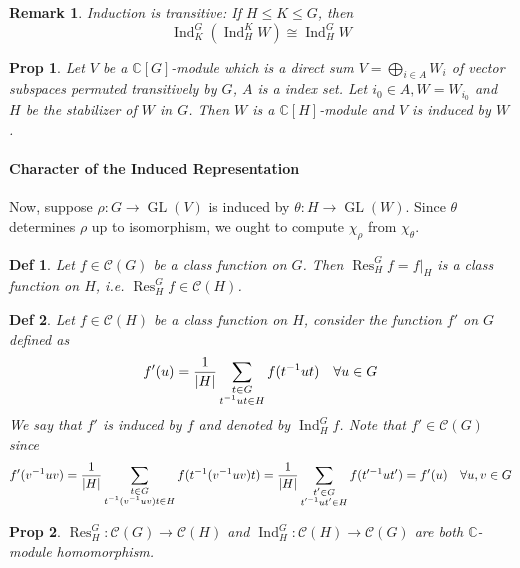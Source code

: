 \documentclass[a4paper]{article}
\DeclarePairedDelimiter{\abs}{\lvert}{\rvert}
\newcommand*{\Cb}{\mathbb{C}}
\newcommand*{\Cc}{\mathcal{C}}
\DeclareMathOperator{\Res}{Res}
\DeclareMathOperator{\Ind}{Ind}
\newcommand*\GL[1]{\operatorname{GL}\mathopen{}\left({#1}\right)\mathclose{}}
\theoremstyle{mystyle}
\newtheorem{remark}{Remark}
\newtheorem{definition}{Def}
\newtheorem{prop}{Prop}
\begin{document}
\begin{remark}
  Induction is transitive: If $H \le K \le G$, then
  \[
    \Ind^G_K (\Ind^K_H W) \cong \Ind^G_H W
  \]
\end{remark}

\begin{prop}
  Let $V$ be a $\Cb[G]$-module which is a direct sum
  $V = \bigoplus_{i \in A} W_i$ of vector subspaces {\it permuted transitively}
  by $G$, $A$ is a index set. Let $i_0 \in A, W = W_{i_0}$ and
  $H$ be the stabilizer of $W$ in $G$.
  Then $W$ is a $\Cb[H]$-module and $V$ is induced by $W$.
\end{prop}


\paragraph{Character of the Induced Representation}
Now, suppose $\rho: G\to \GL{V}$ is induced by $\theta: H\to \GL{W}$.
Since $\theta$ determines $\rho$ up to isomorphism, we ought to compute
$\chi_\rho$ from $\chi_\theta$.

\begin{definition}
  Let $f \in \Cc(G)$ be a class function on $G$. Then
  $\Res^G_H f = f|_H$ is a class function on $H$, i.e.
  $\Res^G_H f \in \Cc(H)$.
\end{definition}

\begin{definition}
  Let $f \in \Cc(H)$ be a class function on $H$, consider the function
  $f'$ on $G$ defined as
  \[
    f'(u) = \frac{1}{\abs{H}} \sum_{\substack{t\in G\\ t^{-1}ut \in H}}
    f(t^{-1}ut) \quad \forall u\in G
  \]
  We say that $f'$ is induced by $f$ and denoted by $\Ind^G_H f$.
  Note that $f' \in \Cc(G)$ since
  \[
    f'(v^{-1}uv) = \frac{1}{\abs{H}} \sum_{\substack{t\in G\\ t^{-1}(v^{-1}uv)t \in H}}
    f(t^{-1}(v^{-1}uv)t)
    = \frac{1}{\abs{H}} \sum_{\substack{t'\in G\\ t'^{-1}ut' \in H}}
    f(t'^{-1}ut') = f'(u) \quad \forall u, v\in G
  \]
\end{definition}

\begin{prop}
  \label{prob:linear}
  $\Res^G_H: \Cc(G) \to \Cc(H)$ and $\Ind^G_H: \Cc(H) \to \Cc(G)$ are both
  $\Cb$-module homomorphism.
\end{prop}
\end{document}

